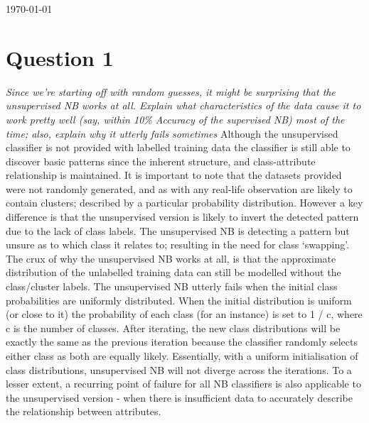 \documentclass[a4paper]{article}
\begin{document}
\begin{titlepage}

{\large \today}\\[2cm] %



\vfill %

\end{titlepage}



\newpage
\section*{Question 1}
\textit{Since we’re starting off with random guesses, it might be surprising that the unsupervised NB works at all. Explain what characteristics of the data cause it to work pretty well (say, within 10\% Accuracy of the supervised NB) most of the time; also, explain why it utterly fails sometimes}
\newline
\newline
Although the unsupervised classifier is not provided with labelled training data the classifier is still able to discover basic patterns since the inherent structure, and class-attribute relationship is maintained. It is important to note that the datasets provided were not randomly generated, and as with any real-life observation are likely to contain clusters; described by a particular probability distribution. However a key difference is that the unsupervised version is likely to invert the detected pattern due to the lack of class labels. The unsupervised NB is detecting a pattern but unsure as to which class it relates to; resulting in the need for class ‘swapping’. The crux of why the unsupervised NB works at all, is that the approximate distribution of the unlabelled training data can still be modelled without the class/cluster labels.
\newline
\newline
The unsupervised NB utterly fails when the initial class probabilities are uniformly distributed. When the initial distribution is uniform (or close to it) the probability of each class (for an instance) is set to 1 / c, where c is the number of classes. After iterating, the new class distributions will be exactly the same as the previous iteration because the classifier randomly selects either class as both are equally likely. Essentially, with a uniform initialisation of class distributions, unsupervised NB will not diverge across the iterations. To a lesser extent, a recurring point of failure for all NB classifiers is also applicable to the unsupervised version - when there is insufficient data to accurately describe the relationship between attributes.
\end{document}

